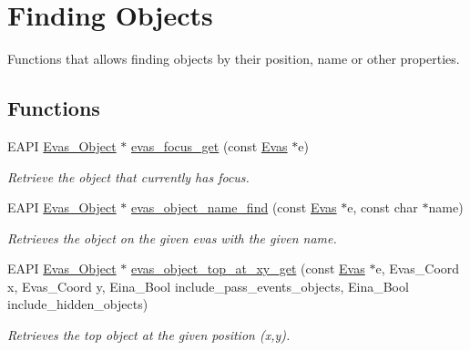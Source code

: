 \section{Finding Objects}
\label{group__Evas__Object__Group__Find}


Functions that allows finding objects by their position, name or other properties.  


\subsection*{Functions}
\begin{DoxyCompactItemize}
\item 
EAPI \hyperlink{group__Evas__Object__Group_ga9e19e6dd1f517a0ba437c0114d3e7c97}{Evas\_\-Object} $\ast$ \hyperlink{group__Evas__Object__Group__Find_gaafc05ec22375400b9f0cfc8bcfc83bf5}{evas\_\-focus\_\-get} (const \hyperlink{group__Evas__Canvas_ga5ff87cc4ce6bc43e3b640a6d37f73043}{Evas} $\ast$e)
\begin{DoxyCompactList}\small\item\em Retrieve the object that currently has focus. \item\end{DoxyCompactList}\item 
EAPI \hyperlink{group__Evas__Object__Group_ga9e19e6dd1f517a0ba437c0114d3e7c97}{Evas\_\-Object} $\ast$ \hyperlink{group__Evas__Object__Group__Find_gad3214c89581f068934c57ac71dc6a52f}{evas\_\-object\_\-name\_\-find} (const \hyperlink{group__Evas__Canvas_ga5ff87cc4ce6bc43e3b640a6d37f73043}{Evas} $\ast$e, const char $\ast$name)
\begin{DoxyCompactList}\small\item\em Retrieves the object on the given evas with the given name. \item\end{DoxyCompactList}\item 
EAPI \hyperlink{group__Evas__Object__Group_ga9e19e6dd1f517a0ba437c0114d3e7c97}{Evas\_\-Object} $\ast$ \hyperlink{group__Evas__Object__Group__Find_ga6028b55f1ec538feb45aa004ba916a54}{evas\_\-object\_\-top\_\-at\_\-xy\_\-get} (const \hyperlink{group__Evas__Canvas_ga5ff87cc4ce6bc43e3b640a6d37f73043}{Evas} $\ast$e, Evas\_\-Coord x, Evas\_\-Coord y, Eina\_\-Bool include\_\-pass\_\-events\_\-objects, Eina\_\-Bool include\_\-hidden\_\-objects)
\begin{DoxyCompactList}\small\item\em Retrieves the top object at the given position (x,y). \item\end{DoxyCompactList}\item 

\end{DoxyCompactItemize}
